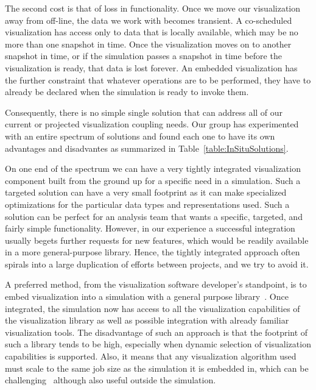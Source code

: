 \documentclass[conference]{IEEEtran}
\newcommand*{\lcite}[1]{~\cite{#1}}
\begin{document}
The second cost is that of loss in functionality.  Once we move our
visualization away from off-line, the data we work with becomes transient.
A co-scheduled visualization has access only to data that is locally
available, which may be no more than one snapshot in time.  Once the
visualization moves on to another snapshot in time, or if the simulation
passes a snapshot in time before the visualization is ready, that data is
lost forever.  An embedded visualization has the further constraint that
whatever operations are to be performed, they have to already be declared
when the simulation is ready to invoke them.

Consequently, there is no simple single solution that can address all of
our current or projected visualization coupling needs.  Our group has
experimented with an entire spectrum of solutions and found each one to
have its own advantages and disadvantes as summarized in
Table~\ref{table:InSituSolutions}.

On one end of the spectrum we can have a very tightly integrated
visualization component built from the ground up for a specific need in a
simulation.  Such a targeted solution can have a very small footprint as it
can make specialized optimizations for the particular data types and
representations used.  Such a solution can be perfect for an analysis team
that wants a specific, targeted, and fairly simple functionality.  However,
in our experience a successful integration usually begets further requests
for new features, which would be readily available in a more
general-purpose library.  Hence, the tightly integrated approach often
spirals into a large duplication of efforts between projects, and we try to
avoid it.

A preferred method, from the visualization software developer's standpoint,
is to embed visualization into a simulation with a general purpose
library\lcite{Fabian2011,VisItLibsim}.  Once integrated, the simulation now
has access to all the visualization capabilities of the visualization
library as well as possible integration with already familiar visualization
tools.  The disadvantage of such an approach is that the footprint of such
a library tends to be high, especially when dynamic selection of
visualization capabilities is supported.  Also, it means that any
visualization algorithm used must scale to the same job size as the
simulation it is embedded in, which can be challenging\lcite{Fabian2012}
although also useful outside the simulation.
\end{document}
